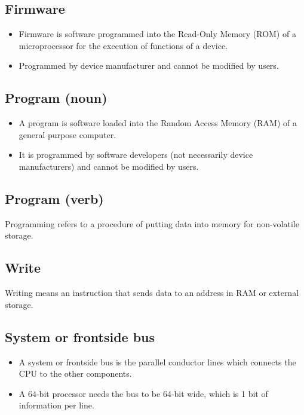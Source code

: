 \documentclass[11pt]{article}
\begin{document}
\subsection{Firmware}
\label{sec:org5ed3c75}
\begin{itemize}
\item Firmware is software programmed into the Read-Only Memory (ROM) of a microprocessor for the execution of functions of a device.
\item Programmed by device manufacturer and cannot be modified by users.
\end{itemize}

\subsection{Program (noun)}
\label{sec:org4a33b64}
\begin{itemize}
\item A program is software loaded into the Random Access Memory (RAM) of a general purpose computer.
\item It is programmed by software developers (not necessarily device manufacturers) and cannot be modified by users.
\end{itemize}

\subsection{Program (verb)}
\label{sec:org99271c6}
Programming refers to a procedure of putting data into memory for non-volatile storage.

\subsection{Write}
\label{sec:org7282593}
Writing means an instruction that sends data to an address in RAM or external storage.

\subsection{System or frontside bus}
\label{sec:org33e1dd4}
\begin{itemize}
\item A system or frontside bus is the parallel conductor lines which connects the CPU to the other components.
\item A 64-bit processor needs the bus to be 64-bit wide, which is 1 bit of information per line.
\end{itemize}
\end{document}
